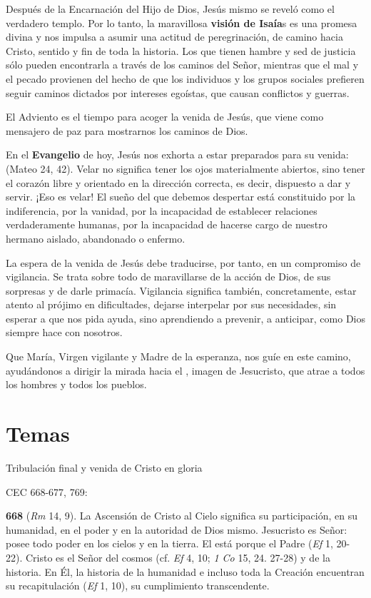 \begin{body}
Después de la Encarnación del Hijo de Dios, Jesús mismo se reveló como el verdadero templo. Por lo tanto, la maravillosa \textbf{visión de Isaía}s es una promesa divina y nos impulsa a asumir una actitud de peregrinación, de camino hacia Cristo, sentido y fin de toda la historia. Los que tienen hambre y sed de justicia sólo pueden encontrarla a través de los caminos del Señor, mientras que el mal y el pecado provienen del hecho de que los individuos y los grupos sociales prefieren seguir caminos dictados por intereses egoístas, que causan conflictos y guerras.

El Adviento es el tiempo para acoger la venida de Jesús, que viene como mensajero de paz para mostrarnos los caminos de Dios.

En el \textbf{Evangelio} de hoy, Jesús nos exhorta a estar preparados para su venida:  (Mateo 24, 42). Velar no significa tener los ojos materialmente abiertos, sino tener el corazón libre y orientado en la dirección correcta, es decir, dispuesto a dar y servir. ¡Eso es velar! El sueño del que debemos despertar está constituido por la indiferencia, por la vanidad, por la incapacidad de establecer relaciones verdaderamente humanas, por la incapacidad de hacerse cargo de nuestro hermano aislado, abandonado o enfermo.

La espera de la venida de Jesús debe traducirse, por tanto, en un compromiso de vigilancia. Se trata sobre todo de maravillarse de la acción de Dios, de sus sorpresas y de darle primacía. Vigilancia significa también, concretamente, estar atento al prójimo en dificultades, dejarse interpelar por sus necesidades, sin esperar a que nos pida ayuda, sino aprendiendo a prevenir, a anticipar, como Dios siempre hace con nosotros.

Que María, Virgen vigilante y Madre de la esperanza, nos guíe en este camino, ayudándonos a dirigir la mirada hacia el , imagen de Jesucristo, que atrae a todos los hombres y todos los pueblos.


\section{Temas}

Tribulación final y venida de Cristo en gloria

CEC 668-677, 769:

\textbf{668}  (\emph{Rm} 14, 9). La Ascensión de Cristo al Cielo significa su participación, en su humanidad, en el poder y en la autoridad de Dios mismo. Jesucristo es Señor: posee todo poder en los cielos y en la tierra. El está  porque el Padre  (\emph{Ef} 1, 20-22). Cristo es el Señor del cosmos (cf. \emph{Ef} 4, 10; \emph{1 Co} 15, 24. 27-28) y de la historia. En Él, la historia de la humanidad e incluso toda la Creación encuentran su recapitulación (\emph{Ef} 1, 10), su cumplimiento transcendente.


\end{body}
